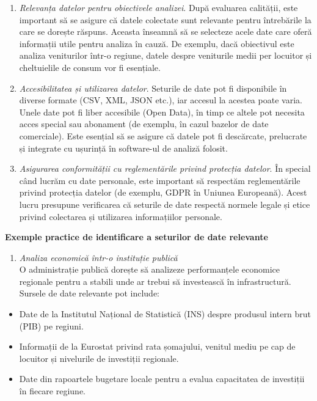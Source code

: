 \documentclass[
  11pt,
  b5paper,
  nottoc]{book}
\providecommand{\tightlist}{%
  \setlength{\itemsep}{0pt}\setlength{\parskip}{0pt}}\usepackage{longtable,booktabs,array}
\begin{document}
\begin{enumerate}
\def\labelenumi{\arabic{enumi}.}
\setcounter{enumi}{3}
\item
  \emph{Relevanța datelor pentru obiectivele analizei}. După evaluarea
  calității, este important să se asigure că datele colectate sunt
  relevante pentru întrebările la care se dorește răspuns. Aceasta
  înseamnă să se selecteze acele date care oferă informații utile pentru
  analiza în cauză. De exemplu, dacă obiectivul este analiza veniturilor
  într-o regiune, datele despre veniturile medii per locuitor și
  cheltuielile de consum vor fi esențiale.
\item
  \emph{Accesibilitatea și utilizarea datelor}. Seturile de date pot fi
  disponibile în diverse formate (CSV, XML, JSON etc.), iar accesul la
  acestea poate varia. Unele date pot fi liber accesibile (Open Data),
  în timp ce altele pot necesita acces special sau abonament (de
  exemplu, în cazul bazelor de date comerciale). Este esențial să se
  asigure că datele pot fi descărcate, prelucrate și integrate cu
  ușurință în software-ul de analiză folosit.
\item
  \emph{Asigurarea conformității cu reglementările privind protecția
  datelor}. În special când lucrăm cu date personale, este important să
  respectăm reglementările privind protecția datelor (de exemplu, GDPR
  în Uniunea Europeană). Acest lucru presupune verificarea că seturile
  de date respectă normele legale și etice privind colectarea și
  utilizarea informațiilor personale.
\end{enumerate}

\textbf{Exemple practice de identificare a seturilor de date relevante}

\begin{enumerate}
\def\labelenumi{\arabic{enumi}.}
\tightlist
\item
  \emph{Analiza economică într-o instituție publică}\\
  O administrație publică dorește să analizeze performanțele economice
  regionale pentru a stabili unde ar trebui să investească în
  infrastructură. Sursele de date relevante pot include:\\
\end{enumerate}

\begin{itemize}
\tightlist
\item
  Date de la Institutul Național de Statistică (INS) despre produsul
  intern brut (PIB) pe regiuni.\\
\item
  Informații de la Eurostat privind rata șomajului, venitul mediu pe cap
  de locuitor și nivelurile de investiții regionale.\\
\item
  Date din rapoartele bugetare locale pentru a evalua capacitatea de
  investiții în fiecare regiune.
\end{itemize}
\end{document}
